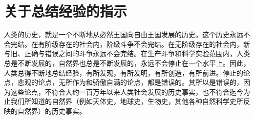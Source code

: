 \section[关于总结经验的指示（一九六四年十二月）]{关于总结经验的指示}


人类的历史，就是一个不断地从必然王国向自由王国发展的历史。这个历史永远不会完结。在有阶级存在的社会内，阶级斗争不会完结。在无阶级存在的社会内，新与旧、正确与错误之间的斗争永远不会完结。在生产斗争和科学实验范围内，人类总是不断发展的，自然界也总是不断发展的，永远不会停止在一个水平上。因此，人类总得不断地总结经验，有所发现，有所发明，有所创造，有所前进。停止的论点，悲观的论点，无所作为和骄傲自满的论点，都是错误的。其所以是错误的，因为这些论点，不符合大约一百万年以来人类社会发展的历史事实，也不符合迄今为止我们所知道的自然界（例如天体史，地球史，生物史，其他各种自然科学史所反映的自然界）的历史事实。



